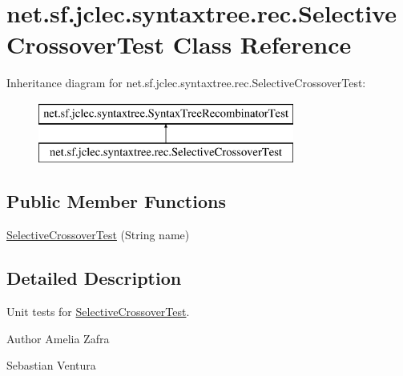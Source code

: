\hypertarget{classnet_1_1sf_1_1jclec_1_1syntaxtree_1_1rec_1_1_selective_crossover_test}{\section{net.\-sf.\-jclec.\-syntaxtree.\-rec.\-Selective\-Crossover\-Test Class Reference}
\label{classnet_1_1sf_1_1jclec_1_1syntaxtree_1_1rec_1_1_selective_crossover_test}
}
Inheritance diagram for net.\-sf.\-jclec.\-syntaxtree.\-rec.\-Selective\-Crossover\-Test\-:\begin{figure}[H]
\begin{center}
\leavevmode
\includegraphics[height=2.000000cm]{classnet_1_1sf_1_1jclec_1_1syntaxtree_1_1rec_1_1_selective_crossover_test}
\end{center}
\end{figure}
\subsection*{Public Member Functions}
\begin{DoxyCompactItemize}
\item 
\hyperlink{classnet_1_1sf_1_1jclec_1_1syntaxtree_1_1rec_1_1_selective_crossover_test_ab0f6e2758b1b6400d38ac7ce486833ba}{Selective\-Crossover\-Test} (String name)
\end{DoxyCompactItemize}


\subsection{Detailed Description}
Unit tests for \hyperlink{classnet_1_1sf_1_1jclec_1_1syntaxtree_1_1rec_1_1_selective_crossover_test}{Selective\-Crossover\-Test}.

\begin{DoxyAuthor}{Author}
Amelia Zafra 

Sebastian Ventura 
\end{DoxyAuthor}


